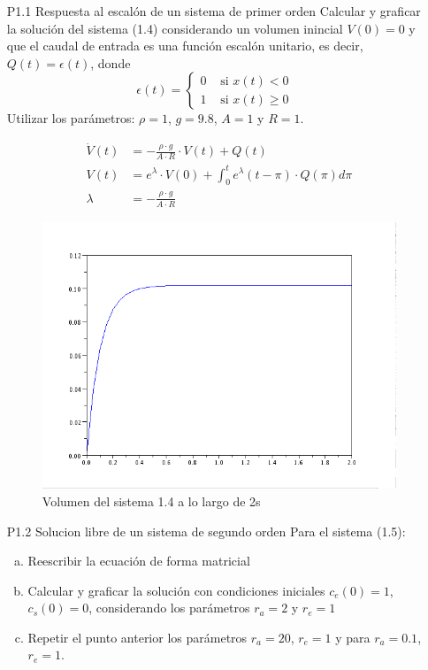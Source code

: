 \documentclass{article}
\begin{document}
\begin{itemize}

  \item[P1.1] Respuesta al escalón de un sistema de primer orden
Calcular y graficar la solución del sistema (1.4) considerando un volumen inincial $ V(0)=0 $ y que el caudal de entrada es una función escalón unitario, es decir, $Q(t)=\epsilon(t)$, donde 
\begin{equation}
\epsilon(t) = \left\{ \begin{array}{rl}
  0 &\mbox{ si $x(t) < 0$} \\
  1 &\mbox{ si $x(t) \geq 0$ }
       \end{array} \right .
 \label{P1.1a} \tag{P1.1a}
\end{equation}
Utilizar los parámetros: $\rho = 1$, $g=9.8$, $A= 1$ y $R = 1$.

\begin{align*}
  \dot{V}(t) &= -\frac{\rho \cdot g}{A \cdot R} \cdot V(t) + Q(t) \\
  V(t) &= e^{\lambda} \cdot V(0) + \int_0^t e^{\lambda} (t - \pi) \cdot Q(\pi) d\pi \\
  \lambda &= -\frac{\rho \cdot g}{A \cdot R}
\end{align*}

\begin{figure}[h]
\includegraphics[width=\textwidth]{img/ej01.png}
\caption{Volumen del sistema 1.4 a lo largo de 2s}
\label{fig:p1.1}
\end{figure}

  \item[P1.2] Solucion libre de un sistema de segundo orden
        Para el sistema (1.5):
        \begin{enumerate}[a)]
        \item Reescribir la ecuación de forma matricial
        \item Calcular y graficar la solución con condiciones iniciales $c_{e}(0)=1$, $c_{s}(0)=0$, considerando los parámetros $r_{a}=2$ y $r_{e}=1$
        \item Repetir el punto anterior los parámetros $r_{a}=20$, $r_{e}=1$ y para $r_{a} = 0.1$, $r_{e}=1$.
        \end{enumerate}


\end{itemize}
\end{document}
